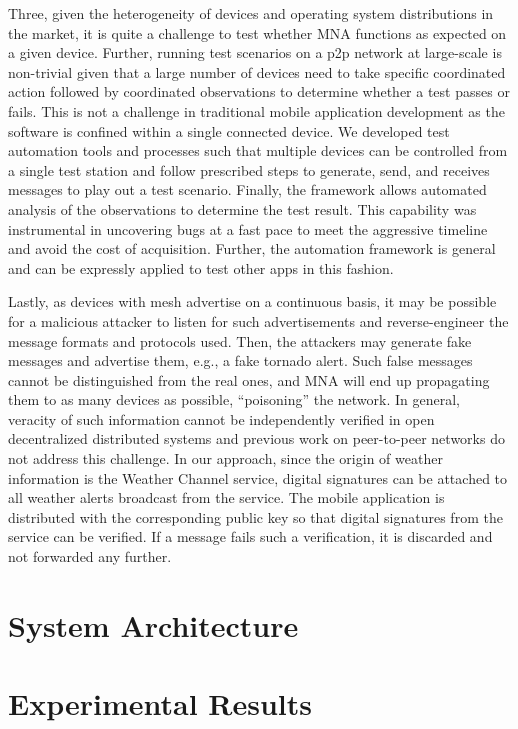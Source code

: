 \documentclass[conference]{IEEEtran}
\begin{document}
Three, given the heterogeneity of devices and operating system distributions in the market, it is quite a challenge to test whether MNA functions as expected on a given device. Further, running test scenarios on a p2p network at large-scale is non-trivial given that a large number of devices need to take specific coordinated action followed by coordinated observations to determine whether a test passes or fails. This is not a challenge in traditional mobile application development as the software is confined within a single connected device. We developed test automation tools and processes such that multiple devices can be controlled from a single test station and follow prescribed steps to generate, send, and receives messages to play out a test scenario. Finally, the framework allows automated analysis of the observations to determine the test result. This capability was instrumental in uncovering bugs at a fast pace to meet the aggressive timeline and avoid the cost of acquisition. Further, the automation framework is general and can be expressly applied to test other apps in this fashion.

Lastly, as devices with mesh advertise on a continuous basis, it may be possible for a malicious attacker to listen for such advertisements and reverse-engineer the message formats and protocols used. Then, the attackers may generate fake messages and advertise them, e.g., a fake tornado alert. Such false messages cannot be distinguished from the real ones, and MNA will end up propagating them to as many devices as possible, ``poisoning'' the network. In general, veracity of such information cannot be independently verified in open decentralized distributed systems and previous work on peer-to-peer networks do not address this challenge. In our approach, since the origin of weather information is the Weather Channel service, digital signatures can be attached to all weather alerts broadcast from the service. The mobile application is distributed with the corresponding public key so that digital signatures from the service can be verified. If a message fails such a verification, it is discarded and not forwarded any further.

\section{System Architecture}

\section{Experimental Results}
\end{document}
